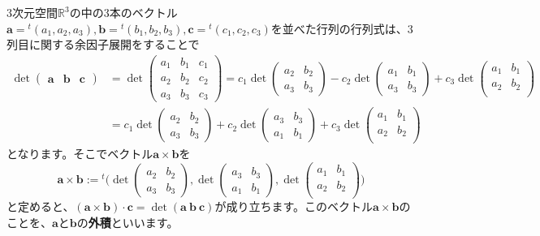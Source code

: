 $3$次元空間$\mathbb{R}^3$の中の$3$本のベクトル$\bm{a} = {}^t(a_1, a_2, a_3), \bm{b} = {}^t(b_1, b_2, b_3), \bm{c} = {}^t(c_1, c_2, c_3)$を並べた行列の行列式は、$3$列目に関する余因子展開をすることで
\begin{align*}
\det
\begin{pmatrix}
\bm{a} & \bm{b} & \bm{c} 
\end{pmatrix}
&=
\det
\begin{pmatrix}
a_1 & b_1 & c_1 \\
a_2 & b_2 & c_2 \\
a_3 & b_3 & c_3
\end{pmatrix}
= 
c_1 \det
\begin{pmatrix}
a_2 & b_2 \\
a_3 & b_3
\end{pmatrix}
- c_2 \det
\begin{pmatrix}
a_1 & b_1 \\
a_3 & b_3
\end{pmatrix}
+ c_3 \det
\begin{pmatrix}
a_1 & b_1 \\
a_2 & b_2 \\
\end{pmatrix}
\\
&=
c_1 \det
\begin{pmatrix}
a_2 & b_2 \\
a_3 & b_3
\end{pmatrix}
+ c_2 \det
\begin{pmatrix}
a_3 & b_3 \\
a_1 & b_1
\end{pmatrix}
+ c_3 \det
\begin{pmatrix}
a_1 & b_1 \\
a_2 & b_2 \\
\end{pmatrix}
\end{align*}
となります。そこでベクトル$\bm{a} \times \bm{b}$を
\[
\bm{a} \times \bm{b}
:= 
{}^t\biggl(
\det
\begin{pmatrix}
a_2 & b_2 \\
a_3 & b_3
\end{pmatrix}, 
\det
\begin{pmatrix}
a_3 & b_3 \\
a_1 & b_1
\end{pmatrix}, 
\det
\begin{pmatrix}
a_1 & b_1 \\
a_2 & b_2 \\
\end{pmatrix}
\biggr)
\]
と定めると、$(\bm{a} \times \bm{b}) \cdot \bm{c} = \det(\bm{a} \ \bm{b} \ \bm{c})$が成り立ちます。このベクトル$\bm{a} \times \bm{b}$のことを、$\bm{a}$と$\bm{b}$の\textbf{外積}といいます。

